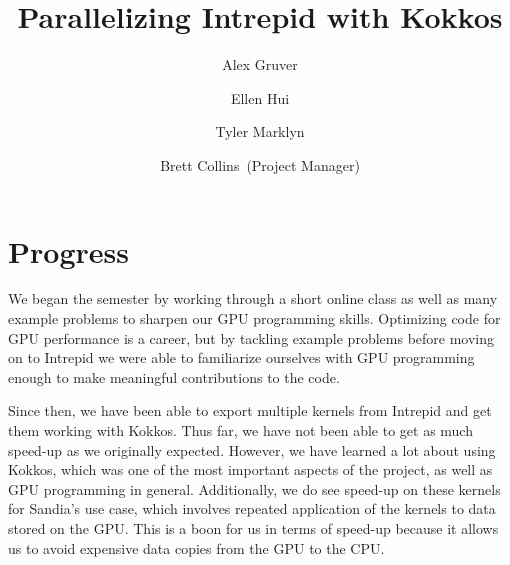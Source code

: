 \documentclass[midyear]{hmcclinic}
\title{Parallelizing Intrepid with Kokkos}
\author{Alex Gruver \and Ellen Hui \and Tyler Marklyn \and Brett Collins~(Project Manager)}
\begin{document}





\maketitle

\mainmatter




\section*{Progress}
We began the semester by working through a short online class as well as many example
problems to sharpen our GPU programming skills. Optimizing code for GPU
performance is a career, but by tackling example problems before moving on to
Intrepid we were able to familiarize ourselves with GPU programming enough to
make meaningful contributions to the code.

Since then, we have been able to export multiple kernels from Intrepid and get
them working with Kokkos. Thus far, we have not been able to get as much speed-up as we
originally expected. However, we have learned a lot about using
Kokkos, which was one of the most important aspects of the project, as well as
GPU programming in general. Additionally, we do see speed-up on these kernels
for Sandia's use case, which involves repeated application of the kernels to
data stored on the GPU. This is a boon for us in terms of speed-up because it
allows us to avoid expensive data copies from the GPU to the CPU.
\end{document}
